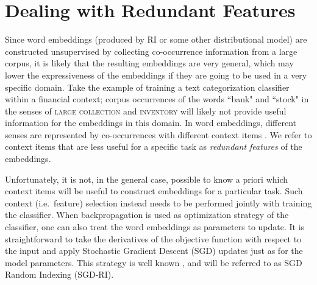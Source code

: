 \documentclass[11pt]{article}
\begin{document}


\section{Dealing with Redundant Features} \label{cha:ri}

Since word embeddings (produced by RI or some other distributional model) are constructed unsupervised by collecting co-occurrence information from a large corpus, it is likely that the resulting embeddings are very general, which may lower the expressiveness of the embeddings if they are going to be used in a very specific domain. Take the example of training a text categorization classifier within a financial context; corpus occurrences of the words ``bank" and ``stock" in the senses of \textsc{large collection} and \textsc{inventory} will likely not provide useful information for the embeddings in this domain. 
In word embeddings, different senses are represented by co-occurrences with different context items \cite{Gyllensten:Sahlgren:2015}. We refer to context items that are less useful for a specific task as {\em redundant features} of the embeddings. 

Unfortunately, it is not, in the general case, possible to know a priori which context items will be useful to construct embeddings for a particular task. Such context (i.e.~feature) selection instead needs to be performed jointly with training the classifier. When backpropagation is used as optimization strategy of the classifier, one can also treat the word embeddings as parameters to update. It is straightforward to take the derivatives of the objective function with respect to the input and apply Stochastic Gradient Descent (SGD) updates just as for the model parameters. This strategy is well known \cite{ZhangWallace2015}, and will be referred to as SGD Random Indexing (SGD-RI). 
\end{document}
